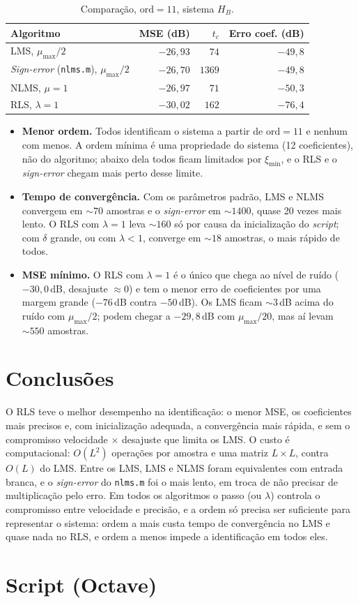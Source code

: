 \documentclass[11pt,a4paper]{article}
\begin{document}
\begin{table}[H]
\centering
\caption{Comparação, $\text{ord}=11$, sistema $H_B$.}
\begin{tabular}{lrrr}
\toprule
\textbf{Algoritmo} & \textbf{MSE (dB)} & $t_c$ & \textbf{Erro coef. (dB)} \\
\midrule
LMS, $\mu_{\max}/2$                & $-26{,}93$ & $74$   & $-49{,}8$ \\
\emph{Sign-error} (\texttt{nlms.m}), $\mu_{\max}/2$ & $-26{,}70$ & $1369$ & $-49{,}8$ \\
NLMS, $\mu=1$                      & $-26{,}97$ & $71$   & $-50{,}3$ \\
RLS, $\lambda=1$                   & $-30{,}02$ & $162$  & $-76{,}4$ \\
\bottomrule
\end{tabular}
\end{table}

\begin{itemize}\itemsep0pt
  \item \textbf{Menor ordem.} Todos identificam o sistema a partir de
        $\text{ord}=11$ e nenhum com menos. A ordem mínima é uma propriedade do sistema
        (12 coeficientes), não do algoritmo; abaixo dela todos ficam limitados por
        $\xi_{\min}$, e o RLS e o \emph{sign-error} chegam mais perto desse limite.
  \item \textbf{Tempo de convergência.} Com os parâmetros padrão, LMS e NLMS convergem em
        $\sim\!70$ amostras e o \emph{sign-error} em $\sim\!1400$, quase 20 vezes mais
        lento. O RLS com $\lambda=1$ leva $\sim\!160$ só por causa da inicialização do
        \emph{script}; com $\delta$ grande, ou com $\lambda<1$, converge em
        $\sim\!18$ amostras, o mais rápido de todos.
  \item \textbf{MSE mínimo.} O RLS com $\lambda=1$ é o único que chega ao nível de ruído
        ($-30{,}0$\,dB, desajuste $\approx 0$) e tem o menor erro de coeficientes por uma
        margem grande ($-76$\,dB contra $-50$\,dB). Os LMS ficam $\sim\!3$\,dB acima do
        ruído com $\mu_{\max}/2$; podem chegar a $-29{,}8$\,dB com $\mu_{\max}/20$, mas
        aí levam $\sim\!550$ amostras.
\end{itemize}

\section{Conclusões}

O RLS teve o melhor desempenho na identificação: o menor MSE, os coeficientes mais
precisos e, com inicialização adequada, a convergência mais rápida, e sem o compromisso
velocidade $\times$ desajuste que limita os LMS. O custo é computacional: $O(L^2)$
operações por amostra e uma matriz $L\times L$, contra $O(L)$ do LMS. Entre os LMS, LMS
e NLMS foram equivalentes com entrada branca, e o \emph{sign-error} do \texttt{nlms.m}
foi o mais lento, em troca de não precisar de multiplicação pelo erro. Em todos os
algoritmos o passo (ou $\lambda$) controla o compromisso entre velocidade e precisão, e
a ordem só precisa ser suficiente para representar o sistema: ordem a mais custa tempo
de convergência no LMS e quase nada no RLS, e ordem a menos impede a identificação em
todos eles.

\section*{Script (Octave)}


\end{document}
